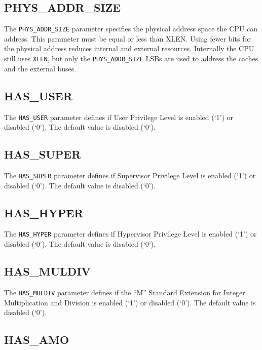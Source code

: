 \subsection{PHYS\_ADDR\_SIZE}\label{phys_addr_size}

The \texttt{PHYS\_ADDR\_SIZE} parameter specifies the physical address space the
CPU can address. This parameter must be equal or less than XLEN. Using fewer
bits for the physical address reduces internal and external resources.
Internally the CPU still uses \texttt{XLEN}, but only the
\texttt{PHYS\_ADDR\_SIZE} LSBs are used to address the caches and the external
buses.

\subsection{HAS\_USER}\label{has_user}

The \texttt{HAS\_USER} parameter defines if User Privilege Level is enabled
(`1') or disabled (`0'). The default value is disabled (`0').

\subsection{HAS\_SUPER}\label{has_super}

The \texttt{HAS\_SUPER} parameter defines if Supervisor Privilege Level is
enabled (`1') or disabled (`0'). The default value is disabled (`0').

\subsection{HAS\_HYPER}\label{has_hyper}

The \texttt{HAS\_HYPER} parameter defines if Hypervisor Privilege Level is
enabled (`1') or disabled (`0'). The default value is disabled (`0').

\subsection{HAS\_MULDIV}\label{has_muldiv}

The \texttt{HAS\_MULDIV} parameter defines if the ``M'' Standard Extension for
Integer Multiplication and Division is enabled (`1') or disabled (`0').
The default value is disabled (`0').

\subsection{HAS\_AMO}\label{has_amo}

